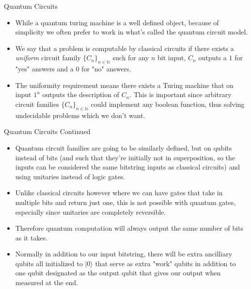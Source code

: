 \documentclass[aspectratio=169]{beamer}
\begin{document}
\begin{frame}{Quantum Circuits}
  \begin{itemize}
    \item While a quantum turing machine is a well defined object, because of simplicity we often prefer to work in what's called the quantum circuit model. \pause
    \item We say that a problem is computable by classical circuits if there exists a \emph{uniform} circuit family $\{C_n\}_{n \in \mathbb{N}}$ such for any $n$ bit input, $C_n$ outputs a $1$ for "yes" answers and a $0$ for "no" answers. \pause
    \item The uniformity requirement means there exists a Turing machine that on input $1^n$ outputs the description of $C_n$. This is important since arbitrary circuit families $\{C_n\}_{n \in \mathbb{N}}$ could implement any boolean function, thus solving undecidable problems which we don't want.
  \end{itemize}
\end{frame}

\begin{frame}{Quantum Circuits Continued}
  \begin{itemize}
    \item Quantum circuit families are going to be similarly defined, but on qubits instead of bits (and such that they're initially not in superposition, so the inputs can be considered the same bitstring inputs as classical circuits) and using unitaries instead of logic gates. \pause
    \item Unlike classical circuits however where we can have gates that take in multiple bits and return just one, this is not possible with quantum gates, especially since unitaries are completely reversible. \pause
    \item Therefore quantum computation will always output the same number of bits as it takes. \pause
    \item Normally in addition to our input bitstring, there will be extra ancilliary qubits all initialized to $|0\rangle$ that serve as extra "work" qubits in addition to one qubit designated as the output qubit that gives our output when measured at the end.
  \end{itemize}
\end{frame}
\end{document}
